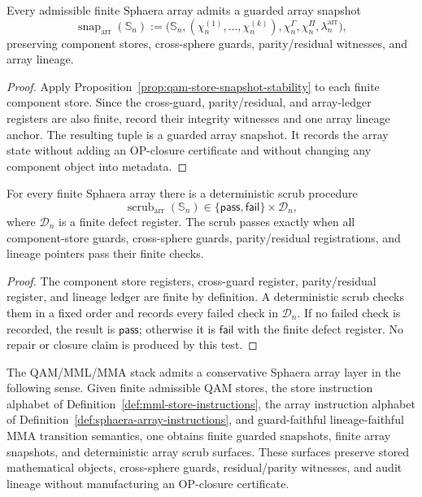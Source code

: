 \begin{proposition}\label{prop:sphaera-array-snapshot}
Every admissible finite Sphaera array admits a guarded array snapshot
\[
  \operatorname{snap}_{\mathrm{arr}}(\mathbb S_n)
  :=
  \bigl(\mathbb S_n,(\chi_n^{(1)},\ldots,\chi_n^{(k)}),\chi_n^{\Gamma},\chi_n^{\Pi},\lambda_n^{\mathrm{arr}}\bigr),
\]
preserving component stores, cross-sphere guards, parity/residual witnesses, and array lineage.
\end{proposition}

\begin{proof}
Apply Proposition~\ref{prop:qam-store-snapshot-stability} to each finite component store. Since the cross-guard, parity/residual, and array-ledger registers are also finite, record their integrity witnesses and one array lineage anchor. The resulting tuple is a guarded array snapshot. It records the array state without adding an OP-closure certificate and without changing any component object into metadata.
\end{proof}

\begin{proposition}\label{prop:sphaera-array-scrub}
For every finite Sphaera array there is a deterministic scrub procedure
\[
  \operatorname{scrub}_{\mathrm{arr}}(\mathbb S_n)
  \in
  \{\mathsf{pass},\mathsf{fail}\}\times\mathcal D_n,
\]
where \(\mathcal D_n\) is a finite defect register. The scrub passes exactly when all component-store guards, cross-sphere guards, parity/residual registrations, and lineage pointers pass their finite checks.
\end{proposition}

\begin{proof}
The component store registers, cross-guard register, parity/residual register, and lineage ledger are finite by definition. A deterministic scrub checks them in a fixed order and records every failed check in \(\mathcal D_n\). If no failed check is recorded, the result is \(\mathsf{pass}\); otherwise it is \(\mathsf{fail}\) with the finite defect register. No repair or closure claim is produced by this test.
\end{proof}

\begin{theorem}\label{thm:qam-mml-mma-sphaera-array-layer}
The QAM/MML/MMA stack admits a conservative Sphaera array layer in the following sense. Given finite admissible QAM stores, the store instruction alphabet of Definition~\ref{def:mml-store-instructions}, the array instruction alphabet of Definition~\ref{def:sphaera-array-instructions}, and guard-faithful lineage-faithful MMA transition semantics, one obtains finite guarded snapshots, finite array snapshots, and deterministic array scrub surfaces. These surfaces preserve stored mathematical objects, cross-sphere guards, residual/parity witnesses, and audit lineage without manufacturing an OP-closure certificate.
\end{theorem}


